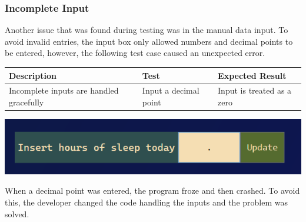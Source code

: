 \documentclass[12pt]{article}
\begin{document}
\subsubsection{Incomplete Input}
Another issue that was found during testing was in the manual data input. To avoid 
invalid entries, the input box only allowed numbers and decimal points to be entered, 
however, the following test case caused an unexpected error.\par
\begin{center}
    \begin{tabular}{|p{5cm}|p{5cm}|p{5cm}|}
        \hline
        \textbf{Description} & \textbf{Test} & \textbf{Expected Result}\\
        \hline
        Incomplete inputs are handled gracefully 
        & Input a decimal point 
        & Input is treated as a zero\\
        \hline
    \end{tabular}
\end{center}
\begin{center}
    \includegraphics[width=0.8\linewidth]{decimalPointError.png}
\end{center}
When a decimal point was entered, the program froze and then crashed. 
To avoid this, the developer changed the code handling the inputs and 
the problem was solved.\par
\end{document}
